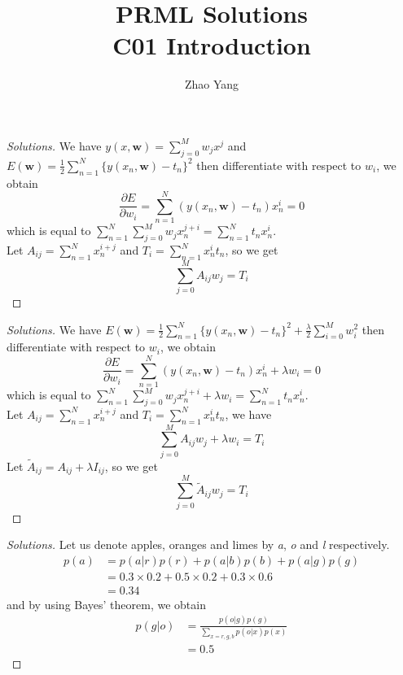 \documentclass[12pt, a4paper]{article}
\title{PRML Solutions\\C01 Introduction}
\author{Zhao Yang}
\affil{Department of Automation, Tsinghua Unversity}
\date{}
\newenvironment{exercise}[2][Ex]{\begin{trivlist}
\item[\hskip \labelsep {\bfseries #1}\hskip \labelsep {\bfseries #2.}]}{\end{trivlist}}
\begin{document}
 
\maketitle
 
\begin{exercise}{1.1(*)} %
    \begin{proof}[Solutions]
        We have $y(x,\bm{w})=\sum_{j=0}^Mw_jx^j$ and $E(\bm{w})=\frac{1}{2}\sum_{n=1}
        ^N\{y(x_n,\bm{w})-t_n\}^2$ then differentiate with respect to $w_i$, we obtain
        \begin{equation}
            \frac{\partial E}{\partial w_i}=\sum_{n=1}^N(y(x_n,\bm{w})-t_n)x_n^i=0
        \end{equation}
        which is equal to $\sum_{n=1}^N\sum_{j=0}^Mw_jx_n^{j+i}=\sum_{n=1}^Nt_nx_n^i$.\\
        Let $A_{ij}=\sum_{n=1}^Nx_n^{i+j}$ and $T_i=\sum_{n=1}^Nx_n^it_n$, so we get
        \[
            \sum_{j=0}^MA_{ij}w_j=T_i
        \]
    \end{proof}
\end{exercise}
\begin{exercise}{1.2(*)}
    \begin{proof}[Solutions]
        We have $E(\bm{w})=\frac{1}{2}\sum_{n=1}^N\{y(x_n,\bm{w})-t_n\}^2+\frac{\lambda}{2}
        \sum_{i=0}^Mw_i^2$ then differentiate with respect to $w_i$, we obtain
        \begin{equation}
            \frac{\partial E}{\partial w_i}=\sum_{n=1}^N(y(x_n,\bm{w})-t_n)x_n^i+\lambda 
            w_i=0
        \end{equation}
        which is equal to $\sum_{n=1}^N\sum_{j=0}^Mw_jx_n^{j+i}+\lambda w_i=\sum_{n=1}^N
        t_nx_n^i$.\\
        Let $A_{ij}=\sum_{n=1}^Nx_n^{i+j}$ and $T_i=\sum_{n=1}^Nx_n^it_n$, we have
        \[
            \sum_{j=0}^MA_{ij}w_j+\lambda w_i=T_i 
            \]
        Let $\widetilde{A}_{ij}=A_{ij}+\lambda I_{ij}$, so we get
        \[
            \sum_{j=0}^M\widetilde{A}_{ij}w_j=T_i
            \]
    \end{proof}
\end{exercise}
\begin{exercise}{1.3(**)}
    \begin{proof}[Solutions]
        Let us denote apples, oranges and limes by \emph{a}, \emph{o} and \emph{l} respectively.
        \begin{align}
            p(a)&=p(a|r)p(r)+p(a|b)p(b)+p(a|g)p(g)\nonumber\\
            &=0.3\times 0.2+0.5\times 0.2+0.3\times 0.6\nonumber\\
            &=0.34
        \end{align}
        and by using Bayes' theorem, we obtain
        \begin{align}
            p(g|o)&=\frac{p(o|g)p(g)}{\sum_{x=r,g,b}p(o|x)p(x)}\nonumber\\
            &=0.5
        \end{align}
    \end{proof}
\end{exercise}
\end{document}
